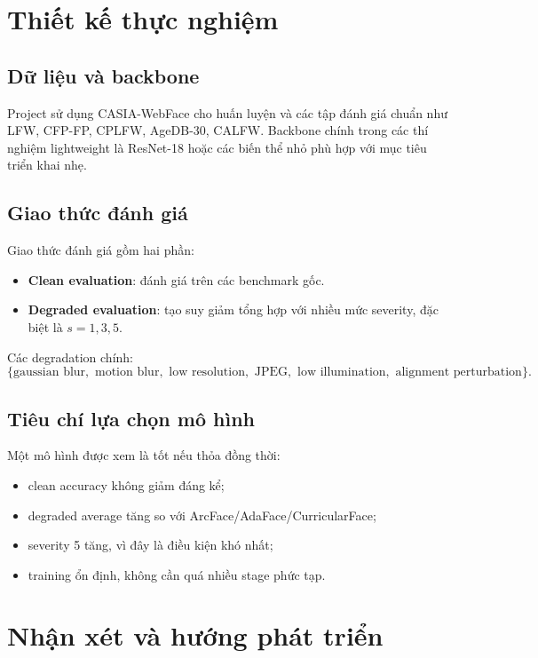 \documentclass[13pt,a4paper]{extreport}
\begin{document}
\chapter{Thiết kế thực nghiệm}

\section{Dữ liệu và backbone}
Project sử dụng CASIA-WebFace cho huấn luyện và các tập đánh giá chuẩn như LFW, CFP-FP, CPLFW, AgeDB-30, CALFW. Backbone chính trong các thí nghiệm lightweight là ResNet-18 hoặc các biến thể nhỏ phù hợp với mục tiêu triển khai nhẹ.

\section{Giao thức đánh giá}
Giao thức đánh giá gồm hai phần:
\begin{itemize}[leftmargin=1.2cm]
    \item \textbf{Clean evaluation}: đánh giá trên các benchmark gốc.
    \item \textbf{Degraded evaluation}: tạo suy giảm tổng hợp với nhiều mức severity, đặc biệt là $s=1,3,5$.
\end{itemize}

Các degradation chính:
\begin{equation}
    \{\text{gaussian blur},\text{ motion blur},\text{ low resolution},\text{ JPEG},\text{ low illumination},\text{ alignment perturbation}\}.
\end{equation}

\section{Tiêu chí lựa chọn mô hình}
Một mô hình được xem là tốt nếu thỏa đồng thời:
\begin{itemize}[leftmargin=1.2cm]
    \item clean accuracy không giảm đáng kể;
    \item degraded average tăng so với ArcFace/AdaFace/CurricularFace;
    \item severity 5 tăng, vì đây là điều kiện khó nhất;
    \item training ổn định, không cần quá nhiều stage phức tạp.
\end{itemize}

\chapter{Nhận xét và hướng phát triển}
\end{document}
